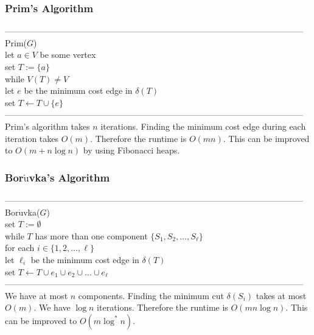 \documentclass{article}
\newcommand{\emp}{\emptyset}
\newcommand{\de}{\delta}
\begin{document}
\subsubsection{Prim's Algorithm}
---------------------------------------------------------------------------------------------------------
Prim($G$)\\
	\hspace*{7mm} let $a \in V$ be some vertex\\
	\hspace*{7mm} set $T := \{a\}$\\
	\hspace*{7mm} while $V(T) \neq V$\\
	\hspace*{14mm} let $e$ be the minimum cost edge in $\de(T)$\\
	\hspace*{14mm} set $T \leftarrow T \cup \{e\}$\\
---------------------------------------------------------------------------------------------------------\\
Prim's algorithm takes $n$ iterations. Finding the minimum cost edge during each iteration takes $O(m)$. Therefore the runtime is $O(mn)$. This can be improved to $O(m + n \log n)$ by using Fibonacci heaps.
\subsubsection{Bor$\mathring{\text{u}}$vka's Algorithm}
---------------------------------------------------------------------------------------------------------
Bor$\mathring{\text{u}}$vka($G$)\\
	\hspace*{7mm} set $T := \emp$\\
	\hspace*{7mm} while $T$ has more than one component $\{S_1, S_2, \dots, S_\ell\}$\\
	\hspace*{14mm} for each $i \in \{1, 2, \dots, \ell\}$\\
	\hspace*{21mm} let $\ell_i$ be the minimum cost edge in $\de(T)$ \\
	\hspace*{21mm} set $T \leftarrow T \cup e_1 \cup e_2 \cup \dots \cup e_{\ell}$\\
---------------------------------------------------------------------------------------------------------\\
We have at most $n$ components. Finding the minimum cut $\de(S_i)$ takes at most $O(m)$. We have $\log n$ iterations. Therefore the runtime is $O(mn \log n)$. This can be improved to $O(m \log^*n)$. 
\end{document}
